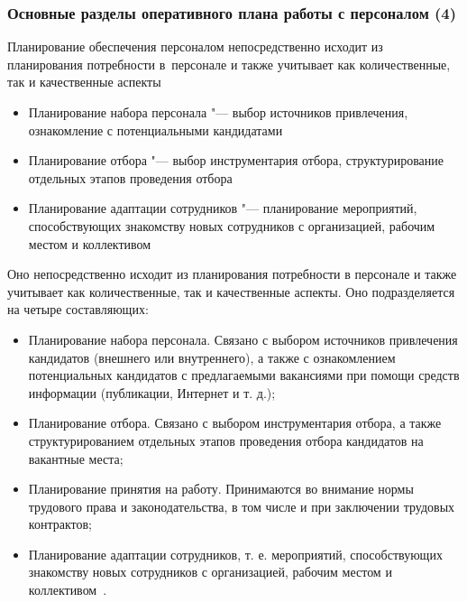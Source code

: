 \documentclass{../industrial-development}
\begin{document}
\begin{frame} \frametitle{Основные разделы оперативного плана работы с персоналом (4)}
	\alert{Планирование обеспечения персоналом} непосредственно исходит из планирования потребности в~персонале и также учитывает как количественные, так и качественные аспекты
	\begin{itemize}
		\item {\small Планирование набора персонала "--- выбор источников привлечения, ознакомление с потенциальными кандидатами}
		\item {\small Планирование отбора "--- выбор инструментария отбора, структурирование отдельных этапов проведения отбора}
		\item {\small Планирование адаптации сотрудников "--- планирование мероприятий, способствующих знакомству новых сотрудников с организацией, рабочим местом и коллективом}
	\end{itemize}
\end{frame}

\lecturenotes

Оно непосредственно исходит из планирования потребности в персонале и также учитывает как количественные, так и качественные аспекты. Оно подразделяется на четыре составляющих:
\begin{itemize}
	\item Планирование набора персонала. Связано с выбором источников привлечения кандидатов (внешнего или внутреннего), а также с ознакомлением потенциальных кандидатов с предлагаемыми вакансиями при помощи средств информации (публикации, Интернет и т. д.);
	\item Планирование отбора. Связано с выбором инструментария отбора, а также структурированием отдельных этапов проведения отбора кандидатов на вакантные места;
	\item Планирование принятия на работу. Принимаются во внимание нормы трудового права и законодательства, в том числе и при заключении трудовых контрактов;
	\item Планирование адаптации сотрудников, т. е. мероприятий, способствующих знакомству новых сотрудников с организацией, рабочим местом и коллективом~\cite{Durakova}.
\end{itemize}
\end{document}
